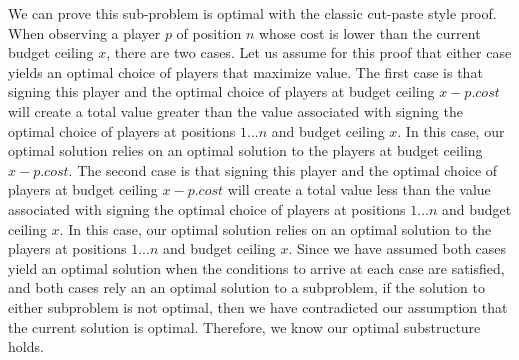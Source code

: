 \documentclass[11pt]{article}
\begin{document}
We can prove this sub-problem is optimal with the classic cut-paste style proof. When observing a player $p$ of position $n$ whose cost is lower than the current budget ceiling $x$, there are two cases. Let us assume for this proof that either case yields an optimal choice of players that maximize value. The first case is that signing this player and the optimal choice of players at budget ceiling $x - p.cost$ will create a total value greater than the value associated with signing the optimal choice of players at positions $1...n$ and budget ceiling $x$. In this case, our optimal solution relies on an optimal solution to the players at budget ceiling $x - p.cost$. The second case is that signing this player and the optimal choice of players at budget ceiling $x - p.cost$ will create a total value less than the value associated with signing the optimal choice of players at positions $1...n$ and budget ceiling $x$. In this case, our optimal solution relies on an optimal solution to the players at positions $1...n$ and budget ceiling $x$. Since we have assumed both cases yield an optimal solution when the conditions to arrive at each case are satisfied, and both cases rely an an optimal solution to a subproblem, if the solution to either subproblem is not optimal, then we have contradicted our assumption that the current solution is optimal. Therefore, we know our optimal substructure holds.
\end{document}
